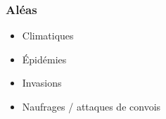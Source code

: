 \documentclass[
]{article}
\providecommand{\tightlist}{%
  \setlength{\itemsep}{0pt}\setlength{\parskip}{0pt}}
\begin{document}
\hypertarget{aluxe9as}{%
\subsubsection{Aléas}\label{aluxe9as}}

\begin{itemize}
\tightlist
\item
  Climatiques
\item
  Épidémies
\item
  Invasions
\item
  Naufrages / attaques de convois
\end{itemize}
\end{document}

